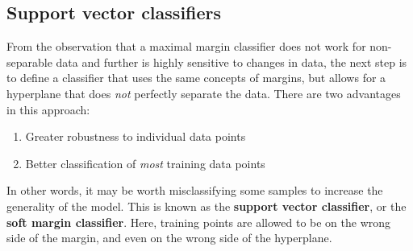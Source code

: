 \documentclass[CS5104-Notes.tex]{subfiles}
\begin{document}
\subsection{Support vector classifiers}
From the observation that a maximal margin classifier does not work for non-separable data and further is highly sensitive to changes in data, the next step is to define a classifier that uses the same concepts of margins, but allows for a hyperplane that does \textit{not} perfectly separate the data. There are two advantages in this approach:
\begin{enumerate}
\item Greater robustness to individual data points
\item Better classification of \textit{most} training data points
\end{enumerate}
In other words, it may be worth misclassifying some samples to increase the generality of the model. This is known as the \textbf{support vector classifier}, or the \textbf{soft margin classifier}. Here, training points are allowed to be on the wrong side of the margin, and even on the wrong side of the hyperplane.
\end{document}
